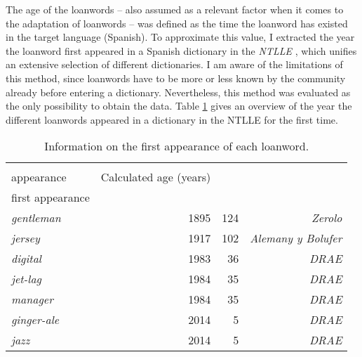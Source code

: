 \documentclass[output=paper]{langscibook}
\begin{document}
The age of the loanwords – also assumed as a relevant factor when it comes to the adaptation of loanwords – was defined as the time the loanword has existed in the target language (Spanish). To approximate this value, I extracted the year the loanword first appeared in a Spanish dictionary in the \textit{\gls*{NTLLE}} \citep[]{RealAcademiaEspanola2019}, which unifies an extensive selection of different dictionaries. I am aware of the limitations of this method, since loanwords have to be more or less known by the community already before entering a dictionary. Nevertheless, this method was evaluated as the only possibility to obtain the data. Table \ref{baumler:tab:age} gives an overview of the year the different loanwords appeared in a dictionary in the \gls*{NTLLE} for the first time.



\begin{table}
\caption{Information on the first appearance of each loanword.}
\label{baumler:tab:age}
{\small
 \begin{tabularx}{\textwidth}{Xrrr}
\midrule\toprule    & \begin{tabular}{l}
    Date of first \\ appearance
\end{tabular}       & 
Calculated age (years)&
\begin{tabular}{l}
Dictionary of \\ first appearance
\end{tabular} \\
  \midrule
  \textit{gentleman}    & 1895                      & 124   & \textit{Zerolo}                    \\
  \textit{jersey}       & 1917                      & 102   & \textit{Alemany y Bolufer}         \\
  \textit{digital}      & 1983                      & 36    & \textit{DRAE}   \\
  \textit{jet-lag}\footnotemark[6]
     & 1984     & 35    & \textit{DRAE}   \\
  \textit{manager}      & 1984                      & 35    & \textit{DRAE}   \\
  \textit{ginger-ale}   & 2014                      & 5     & \textit{DRAE}        \\
  \textit{jazz}         & 2014                      & 5     & \textit{DRAE}       \\
\bottomrule \midrule
 \end{tabularx}
 }
\end{table}  
\end{document}
